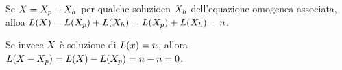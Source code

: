 \Proof Se $X = {X_p} + {X_h}$ per qualche soluzioen ${X_h}$ dell'equazione omogenea associata, alloa $L(X) = L({X_p}) + L({X_h}) = L({X_p}) + L({X_h}) = n$.
\par Se invece $X$ \`e soluzione di $L(x) = n$, allora $L(X - {X_p}) = L(X) - L({X_p}) = n - n = 0$. \EndProof
